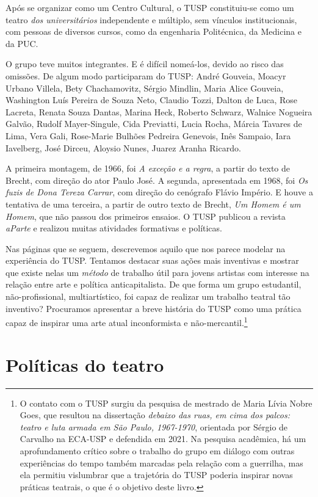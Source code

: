 Após se organizar como um Centro Cultural, o TUSP constituiu-se como um
teatro \textit{dos universitários} independente e múltiplo, sem vínculos
institucionais, com pessoas de diversos cursos, como da engenharia
Politécnica, da Medicina e da PUC.

O grupo teve muitos integrantes. E é difícil nomeá-los, devido ao risco
das omissões. De algum modo participaram do TUSP: André Gouveia, Moacyr
Urbano Villela, Bety Chachamovitz, Sérgio Mindlin, Maria Alice Gouveia,
Washington Luís Pereira de Souza Neto, Claudio Tozzi, Dalton de Luca,
Rose Lacreta, Renata Souza Dantas, Marina Heck, Roberto Schwarz, Walnice
Nogueira Galvão, Rudolf Mayer-Singule, Cida Previatti, Lucia Rocha,
Márcia Tavares de Lima, Vera Gali, Rose-Marie Bulhões Pedreira Genevois,
Inês Sampaio, Iara Iavelberg, José Dirceu, Aloysio Nunes, Juarez Aranha
Ricardo.

A primeira montagem, de 1966, foi \textit{A exceção e a regra}, a partir do
texto de Brecht, com direção do ator Paulo José. A segunda, apresentada
em 1968, foi \textit{Os fuzis de Dona Tereza Carrar}, com direção do
cenógrafo Flávio Império. E houve a tentativa de uma terceira, a partir
de outro texto de Brecht, \textit{Um Homem é um Homem}, que não passou dos
primeiros ensaios. O TUSP publicou a revista \textit{aParte} e realizou
muitas atividades formativas e políticas.

Nas páginas que se seguem, descrevemos aquilo que nos parece modelar na
experiência do TUSP. Tentamos destacar suas ações mais inventivas e
mostrar que existe nelas um \textit{método} de trabalho útil para jovens
artistas com interesse na relação entre arte e política anticapitalista.
De que forma um grupo estudantil, não-profissional, multiartístico, foi
capaz de realizar um trabalho teatral tão inventivo? Procuramos
apresentar a breve história do TUSP como uma prática capaz de inspirar
uma arte atual inconformista e não-mercantil.\footnote{O contato com o
  TUSP surgiu da pesquisa de mestrado de Maria Lívia Nobre Goes, que
  resultou na dissertação \textit{debaixo das ruas, em cima dos palcos:
  teatro e luta armada em São Paulo, 1967-1970}, orientada por Sérgio de
  Carvalho na ECA-USP e defendida em 2021. Na pesquisa acadêmica, há um
  aprofundamento crítico sobre o trabalho do grupo em diálogo com outras
  experiências do tempo também marcadas pela relação com a guerrilha,
  mas ela permitiu vislumbrar que a trajetória do TUSP poderia inspirar
  novas práticas teatrais, o que é o objetivo deste livro.}

\section{Políticas do teatro}

